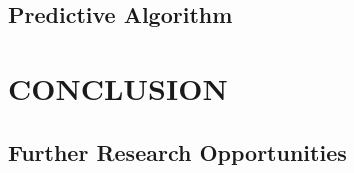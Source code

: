 \documentclass[12pt]{article}
\begin{document}
\begin{multicols}{2}
\subsection{Predictive Algorithm}
\section{CONCLUSION}

\subsection{Further Research Opportunities}

	\end{multicols}
\end{document}
